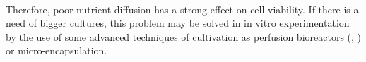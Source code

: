 \\
Therefore, poor nutrient diffusion has a strong effect on cell viability. If there is a need of bigger cultures, this problem may be solved in in vitro experimentation by the use of some advanced techniques of cultivation as perfusion bioreactors (\cite{Dunn2006}, \cite{Goh2013}) or micro-encapsulation.